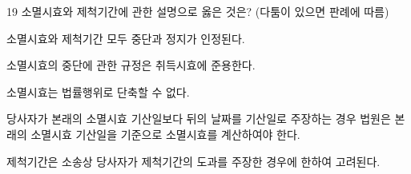 \begin{question}{19}
소멸시효와 제척기간에 관한 설명으로 옳은 것은? (다툼이 있으면 판례에 따름)
\begin{choices}
  \item 소멸시효와 제척기간 모두 중단과 정지가 인정된다.
  \item 소멸시효의 중단에 관한 규정은 취득시효에 준용한다.
  \item 소멸시효는 법률행위로 단축할 수 없다.
  \item 당사자가 본래의 소멸시효 기산일보다 뒤의 날짜를 기산일로 주장하는 경우 법원은 본래의 소멸시효 기산일을 기준으로 소멸시효를 계산하여야 한다.
  \item 제척기간은 소송상 당사자가 제척기간의 도과를 주장한 경우에 한하여 고려된다.
\end{choices}
\end{question}
